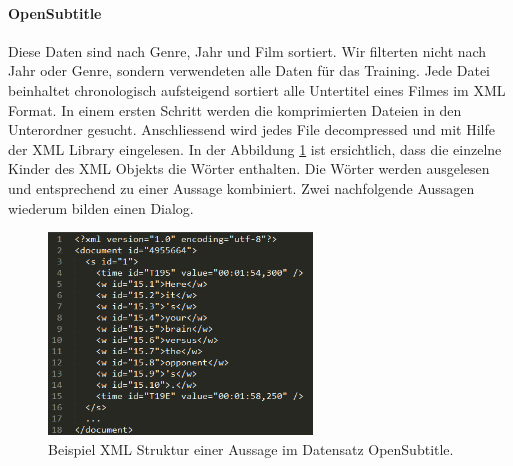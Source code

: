 \paragraph{OpenSubtitle} Diese Daten sind nach Genre, Jahr und Film sortiert. Wir filterten nicht nach Jahr oder Genre, sondern verwendeten alle Daten für das Training. Jede Datei beinhaltet chronologisch aufsteigend sortiert alle Untertitel eines Filmes im XML Format.
In einem ersten Schritt werden die komprimierten Dateien in den Unterordner gesucht. Anschliessend wird jedes File decompressed und mit Hilfe der XML Library eingelesen. In der Abbildung \ref{fig:data:opus:examp:xml} ist ersichtlich, dass die einzelne Kinder des XML Objekts die Wörter enthalten. Die Wörter werden ausgelesen und entsprechend zu einer Aussage kombiniert. Zwei nachfolgende Aussagen wiederum bilden einen Dialog.
\begin{figure}[h]
	\centering
	\includegraphics[width=7cm]{img/OpenSubtitle_example_xml.PNG}
	\caption{Beispiel XML Struktur einer Aussage im Datensatz OpenSubtitle.}
	\label{fig:data:opus:examp:xml}
\end{figure}

